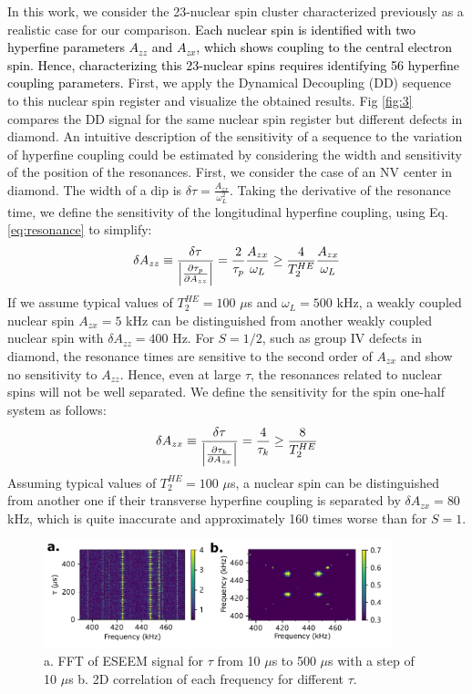 \documentclass[%
 reprint,
superscriptaddress,
 amsmath,amssymb,
 aps,
]{revtex4-2}
\begin{document}
In this work, we consider the 23-nuclear spin cluster characterized previously \cite{abobeih2019atomic} as a realistic case for our comparison.
\textcolor{black}{Each nuclear spin is identified with two hyperfine parameters $A_{zz}$ and $A_{zx}$, which shows coupling to the central electron spin. Hence, characterizing this 23-nuclear spins requires identifying 56 hyperfine coupling parameters.}
First, we apply the Dynamical Decoupling (DD) sequence to this nuclear spin register and visualize the obtained results. Fig \ref{fig:3} compares the DD signal for the same nuclear spin register but different defects in diamond.
An intuitive description of the sensitivity of a sequence to the variation of hyperfine coupling could be estimated by considering the width and sensitivity of the position of the resonances.
First, we consider the case of an NV center in diamond. The width of a dip is $\delta \tau = \frac{A_{zx}}{\omega_L^2}$. Taking the derivative of the resonance time, we define the sensitivity of the longitudinal hyperfine coupling, using Eq. \ref{eq:resonance} to simplify:
\begin{gather}
	\delta A_{zz} \equiv \frac{\delta \tau}{\abs{\frac{\partial \tau_p}{\partial A_{zz}}}} = \frac{2}{\tau_p} \frac{A_{zx}}{\omega_L} \ge \frac{4}{T_2^{HE}} \frac{A_{zx}}{\omega_L}
\end{gather}
If we assume typical values of $T_2^{HE} = 100$ $\mu$s and $\omega_L=500$ kHz, a weakly coupled nuclear spin $A_{zx}=5$ kHz can be distinguished from another weakly coupled nuclear spin with $\delta A_{zz} = 400$ Hz.
For $S=1/2$, such as group IV defects in diamond, the resonance times are sensitive to the second order of $A_{zx}$ and show no sensitivity to $A_{zz}$.
Hence, even at large $\tau$, the resonances related to nuclear spins will not be well separated.
We define the sensitivity for the spin one-half system as follows:
\begin{gather}
	\delta A_{zx} \equiv \frac{\delta \tau}{\abs{\frac{\partial \tau_k}{\partial A_{zx}}}} = \frac{4}{\tau_k} \ge \frac{8}{T_2^{HE}}
\end{gather}
Assuming typical values of $T_2^{HE} = 100$ $\mu$s, a nuclear spin can be distinguished from another one if their transverse hyperfine coupling is separated by $\delta A_{zx} = 80$ kHz, which is quite inaccurate and approximately 160 times worse than for $S=1$.
\begin{figure}%
	\begin{center}
		\includegraphics[width=0.9\textwidth]{figure_3.pdf}
		\caption{a. FFT of ESEEM signal for $\tau$ from 10 $\mu$s to 500 $\mu$s with a step of 10 $\mu$s b. 2D correlation of each frequency for different $\tau$.}
		\label{fig:4}
	\end{center}
\end{figure}
\end{document}
